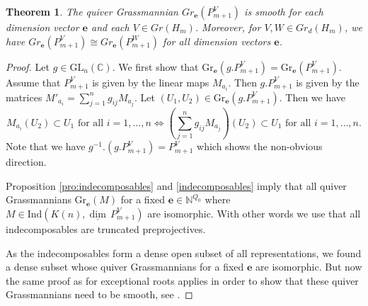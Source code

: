 \documentclass{amsart}
\newtheorem{theorem}{Theorem}[section]
\newcommand{\bfe}{\mathbf{e}}
\newcommand\udim{{\underline{\dim}\, }}
\newcommand{\Gr}{\mathrm{Gr}}
\newcommand{\GL}{\mathrm{GL}}
\newcommand{\Ind}{\mathrm{Ind}}
\newcommand{\CC}{\mathbb{C}}
\newcommand{\NN}{\mathbb{N}}
\begin{document}
\begin{theorem}
  The quiver Grassmannian $Gr_\bfe(P_{m+1}^V)$ is smooth for each dimension vector $\bfe$ and each $V\in Gr(H_m)$.
  Moreover, for $V,W\in Gr_d(H_m)$, we have $Gr_\bfe(P_{m+1}^V)\cong Gr_\bfe(P_{m+1}^W)$ for all dimension vectors $\bfe$.
\end{theorem}
\begin{proof}
Let $g\in\GL_n(\CC)$. We first show that $\Gr_\bfe(g.P_{m+1}^V)=\Gr_\bfe(P_{m+1}^V)$. Assume that $P_{m+1}^V$ is given by the linear maps $M_{a_i}$. Then $g.P_{m+1}^V$ is given by the matrices $M'_{a_i}=\sum\limits_{j=1}^n g_{ij}M_{a_j}$. Let $(U_1,U_2)\in\Gr_\bfe(g.P_{m+1}^V)$. Then we have  
\[M_{a_i}(U_2)\subset U_1 \text{ for all } i=1,\ldots,n\Leftrightarrow \left(\sum\limits_{j=1}^n g_{ij}M_{a_j}\right)(U_2)\subset U_1 \text{ for all } i=1,\ldots,n.\]
Note that we have $g^{-1}.(g.P_{m+1}^V)=P_{m+1}^V$ which shows the non-obvious direction.

Proposition \ref{pro:indecomposables} and \ref{indecomposables} imply that all quiver Grassmannians $\Gr_\bfe(M)$ for a fixed $\bfe\in\NN^{Q_0}$ where $M\in\Ind(K(n),\udim P_{m+1}^V)$ are isomorphic. With other words we use that all indecomposables are truncated preprojectives.

As the indecomposables form a dense open subset of all representations, we found a dense subset whose quiver Grassmannians for a fixed $\bfe$ are isomorphic. But now the same proof as for exceptional roots applies in order to show that these quiver Grassmannians need to be smooth, see \cite[Corollary 4]{cr}.

\end{proof}
\end{document}
